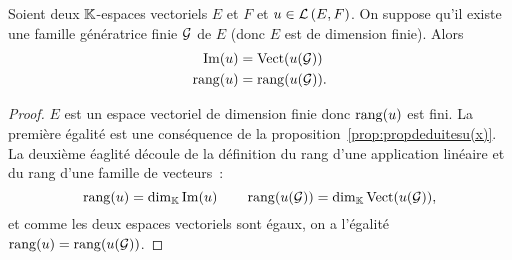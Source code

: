 \begin{prop}
  Soient deux \(\mathbb{K}\)-espaces vectoriels \(E\) et \(F\) et \(u \in \mathcal{L}\left(E,F\right)\). On suppose qu'il existe une famille génératrice finie \(\mathcal{G}\) de \(E\) (donc \(E\) est de dimension finie). Alors
  \begin{align}
    \operatorname{Im}(u) &= \operatorname{Vect}(u(\mathcal{G})) \\
    \operatorname{rang}(u) &= \operatorname{rang}(u(\mathcal{G})).
  \end{align}
\end{prop}
\begin{proof}
  \(E\) est un espace vectoriel de dimension finie donc \(\operatorname{rang}(u)\) est fini. La première égalité est une conséquence de la proposition~\ref{prop:propdeduitesu(x)}. La deuxième éaglité découle de la définition du rang d'une application linéaire et du rang d'une famille de vecteurs~:
  \begin{equation}
    \operatorname{rang}(u) = \operatorname{dim}_{\mathbb{K}} \operatorname{Im}(u) \qquad \operatorname{rang}(u(\mathcal{G}))=\operatorname{dim}_{\mathbb{K}} \operatorname{Vect}(u(\mathcal{G})),
  \end{equation}
  et comme les deux espaces vectoriels sont égaux, on a l'égalité \(\operatorname{rang}(u) = \operatorname{rang}(u(\mathcal{G}))\).
\end{proof}

